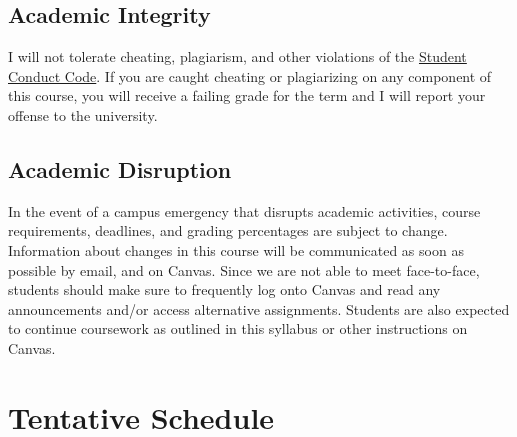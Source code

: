 \documentclass[10pt]{article}
\begin{document}
\subsection*{Academic Integrity} 

I will not tolerate cheating, plagiarism, and other violations of the \href{https://studentlife.uoregon.edu/conduct}{Student Conduct Code}. If you are caught cheating or plagiarizing on any component of this course, you will receive a failing grade for the term and I will report your offense to the university. 

\subsection*{Academic Disruption}

In the event of a campus emergency that disrupts academic activities, course requirements, deadlines, and grading percentages are subject to change. 
Information about changes in this course will be communicated as soon as possible by email, and on Canvas. 
Since we are not able to meet face-to-face, students should make sure to frequently log onto Canvas and read any announcements and/or access alternative assignments. 
Students are also expected to continue coursework as outlined in this syllabus or other instructions on Canvas.


\newpage
\section*{Tentative Schedule}
\end{document}
